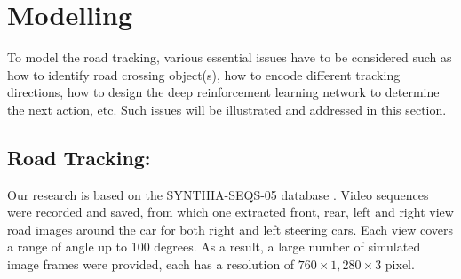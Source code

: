 \documentclass{svproc}
\begin{document}
 


\section{Modelling}
To model the road tracking, various essential issues have to be considered such as how to identify road crossing object(s), how to encode different tracking directions, how to design the deep reinforcement learning network to determine the next action, etc. Such issues will be illustrated and addressed in this section.

\subsection{Road Tracking:} 
Our research is based on the SYNTHIA-SEQS-05 database \cite{Ros2016TheSYNTHIA}. Video sequences were recorded and saved, from which one extracted front,  rear, left and right view road images around the car for both right and left steering cars. Each view covers a range of angle up to 100 degrees. As a result, a large number of simulated image frames were provided, each has a resolution of $760 \times 1,280 \times 3$ pixel. 
\end{document}
